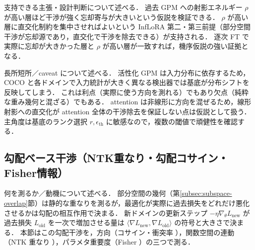 支持できる主張・設計判断について述べる．
過去 GPM への射影エネルギー $\rho$ が高い層ほど干渉が強く忘却寄与が大きいという仮説を検証できる．
$\rho$ が高い層に直交化制約を集中させればよいという InfLoRA 第二・第三前提（部分空間干渉が忘却源であり，直交化で干渉を除去できる）が支持される．
逐次 FT で実際に忘却が大きかった層と $\rho$ が高い層が一致すれば，機序仮説の強い証拠となる．

長所短所／caveat について述べる．
活性化 GPM は入力分布に依存するため，COCO と各ドメインで入力統計が大きく異なる検出器では基底が分布シフトを反映してしまう．
これは利点（実際に使う方向を測れる）でもあり欠点（純粋な重み幾何と混ざる）でもある．
attention は非線形に方向を混ぜるため，線形射影への直交化が attention 全体の干渉除去を保証しない点は仮説として扱う．
主角度は基底のランク選択 $r, \epsilon_{\mathrm{th}}$ に敏感なので，複数の閾値で頑健性を確認する．


\subsection{勾配ベース干渉（NTK重なり・勾配コサイン・Fisher情報）}
\label{subsec:gradient-interference}

何を測るか／動機について述べる．
部分空間の幾何（第\ref{subsec:subspace-overlap}節）は静的な重なりを測るが，最適化が実際に過去損失をどれだけ悪化させるかは勾配の相互作用で決まる．
新ドメインの更新ステップ $-\eta \nabla_\theta L_{\mathrm{new}}$ が過去損失 $L_{\mathrm{old}}$ を一次で増加させる量は $\langle \nabla L_{\mathrm{new}}, \nabla L_{\mathrm{old}} \rangle$ の符号と大きさで決まる．
本節はこの勾配干渉を，方向（コサイン・衝突率 \cite{pcgrad}），関数空間の連動（NTK 重なり \cite{ntkoverlap}），パラメタ重要度（Fisher \cite{ewc}）の三つで測る．

